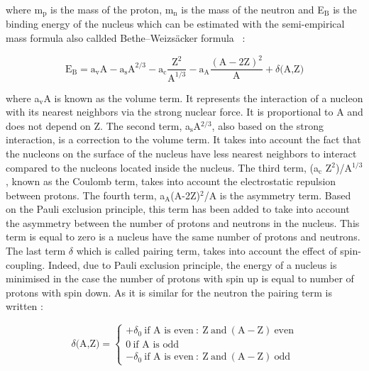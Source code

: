 \documentclass[main.tex]{subfiles}
\begin{document}
\NI where m$_\text{p}$ is the mass of the proton, m$_\text{n}$ is the mass of the neutron and E$_\text{B}$ is the binding energy of the nucleus which can be estimated with the semi-empirical mass formula also callded Bethe–Weizsäcker formula~\cite{WeizsckerFormula} :  


\begin{equation}\label{eq:EB}
\text{E}_\text{B} = \text{a}_\text{v} \text{A} - \text{a}_\text{s} \text{A}^{\text{2/3}} -  \text{a}_\text{c} \frac{\text{Z}^\text{2}}{\text{A}^{\text{1/3}}} - \text{a}_\text{A} \frac{(\text{A}-\text{2Z})^\text{2}}{\text{A}} + \delta \text{(A,Z)} 
\end{equation}


\bigskip


\NI where a$_\text{v}$A is known as the volume term. It represents the interaction of a nucleon with its nearest neighbors via the strong nuclear force. It is proportional to A and does not depend on Z. The second term, a$_\text{s}$A$^{\text{2/3}}$, also based on the strong interaction, is a correction to the volume term. It takes into account the fact that the nucleons on the surface of the nucleus have less nearest neighbors to interact compared to the nucleons located inside the nucleus. The third term, (a$_\text{c}$ Z$^\text{2}$)/A$^{\text{1/3}}$, known as the Coulomb term, takes into account the electrostatic repulsion between protons. The fourth term, a$_\text{A}$(A-2Z)$^\text{2}$/A is the asymmetry term. Based on the Pauli exclusion principle, this term has been added to take into account the asymmetry between the number of protons and neutrons in the nucleus. This term is equal to zero is a nucleus have the same number of protons and neutrons. The last term $\delta$ which is called pairing term, takes into account the effect of spin-coupling. Indeed, due to Pauli exclusion principle, the energy of a nucleus is minimised in the case the number of protons with spin up is equal to number of protons with spin down. As it is similar for the neutron the pairing term is written : 


\begin{equation}
\delta \text{(A,Z)} = 
\left\{
\begin{array}{l}
  +\delta_0~\text{if~A is even}~:~\text{Z}~\text{and}~(\text{A}-\text{Z})~\text{even} \\[0.5cm]
  \text{0}~\text{if~A~is odd}\\[0.5cm]
  -\delta_0~\text{if~A is even}~:~\text{Z}~\text{and}~(\text{A}-\text{Z})~\text{odd}
\end{array}
\right.
\end{equation}
\end{document}
